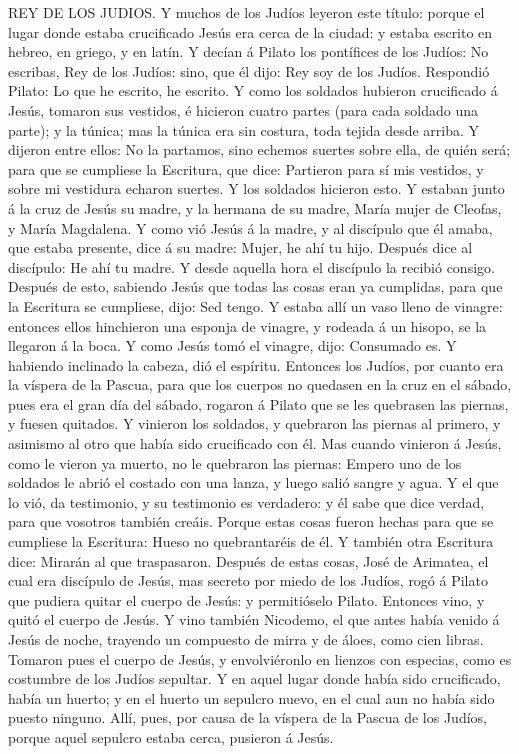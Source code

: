 REY DE LOS JUDIOS.  Y muchos de los Judíos leyeron este
título: porque el lugar donde estaba crucificado Jesús era cerca de la
ciudad: y estaba escrito en hebreo, en griego, y en latín. 
Y decían á Pilato los pontífices de los Judíos: No escribas, Rey de los
Judíos: sino, que él dijo: Rey soy de los Judíos. 
Respondió Pilato: Lo que he escrito, he escrito.  Y como
los soldados hubieron crucificado á Jesús, tomaron sus vestidos, é
hicieron cuatro partes (para cada soldado una parte); y la túnica; mas
la túnica era sin costura, toda tejida desde arriba.  Y
dijeron entre ellos: No la partamos, sino echemos suertes sobre ella, de
quién será; para que se cumpliese la Escritura, que dice: Partieron para
sí mis vestidos, y sobre mi vestidura echaron suertes. Y los soldados
hicieron esto.  Y estaban junto á la cruz de Jesús su
madre, y la hermana de su madre, María mujer de Cleofas, y María
Magdalena.  Y como vió Jesús á la madre, y al discípulo que
él amaba, que estaba presente, dice á su madre: Mujer, he ahí tu hijo.
 Después dice al discípulo: He ahí tu madre. Y desde
aquella hora el discípulo la recibió consigo.  Después de
esto, sabiendo Jesús que todas las cosas eran ya cumplidas, para que la
Escritura se cumpliese, dijo: Sed tengo.  Y estaba allí un
vaso lleno de vinagre: entonces ellos hinchieron una esponja de vinagre,
y rodeada á un hisopo, se la llegaron á la boca.  Y como
Jesús tomó el vinagre, dijo: Consumado es. Y habiendo inclinado la
cabeza, dió el espíritu.  Entonces los Judíos, por cuanto
era la víspera de la Pascua, para que los cuerpos no quedasen en la cruz
en el sábado, pues era el gran día del sábado, rogaron á Pilato que se
les quebrasen las piernas, y fuesen quitados.  Y vinieron
los soldados, y quebraron las piernas al primero, y asimismo al otro que
había sido crucificado con él.  Mas cuando vinieron á
Jesús, como le vieron ya muerto, no le quebraron las piernas:
 Empero uno de los soldados le abrió el costado con una
lanza, y luego salió sangre y agua.  Y el que lo vió, da
testimonio, y su testimonio es verdadero: y él sabe que dice verdad,
para que vosotros también creáis.  Porque estas cosas
fueron hechas para que se cumpliese la Escritura: Hueso no quebrantaréis
de él.  Y también otra Escritura dice: Mirarán al que
traspasaron.  Después de estas cosas, José de Arimatea, el
cual era discípulo de Jesús, mas secreto por miedo de los Judíos, rogó á
Pilato que pudiera quitar el cuerpo de Jesús: y permitióselo Pilato.
Entonces vino, y quitó el cuerpo de Jesús.  Y vino también
Nicodemo, el que antes había venido á Jesús de noche, trayendo un
compuesto de mirra y de áloes, como cien libras.  Tomaron
pues el cuerpo de Jesús, y envolviéronlo en lienzos con especias, como
es costumbre de los Judíos sepultar.  Y en aquel lugar
donde había sido crucificado, había un huerto; y en el huerto un
sepulcro nuevo, en el cual aun no había sido puesto ninguno.
 Allí, pues, por causa de la víspera de la Pascua de los
Judíos, porque aquel sepulcro estaba cerca, pusieron á Jesús.

